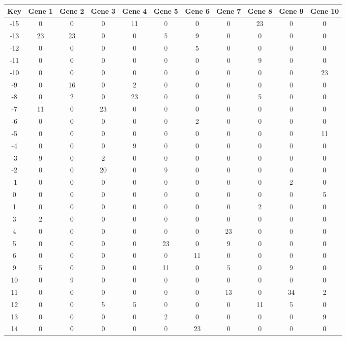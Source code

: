 \begin{tabular}{|c|c|c|c|c|c|c|c|c|c|c|}
\hline
Key & Gene 1 & Gene 2 & Gene 3 & Gene 4 & Gene 5 & Gene 6 & Gene 7 & Gene 8 & Gene 9 & Gene 10 \\
\hline
-15 & 0 & 0 & 0 & 11 & 0 & 0 & 0 & 23 & 0 & 0 \\
-13 & 23 & 23 & 0 & 0 & 5 & 9 & 0 & 0 & 0 & 0 \\
-12 & 0 & 0 & 0 & 0 & 0 & 5 & 0 & 0 & 0 & 0 \\
-11 & 0 & 0 & 0 & 0 & 0 & 0 & 0 & 9 & 0 & 0 \\
-10 & 0 & 0 & 0 & 0 & 0 & 0 & 0 & 0 & 0 & 23 \\
-9 & 0 & 16 & 0 & 2 & 0 & 0 & 0 & 0 & 0 & 0 \\
-8 & 0 & 2 & 0 & 23 & 0 & 0 & 0 & 5 & 0 & 0 \\
-7 & 11 & 0 & 23 & 0 & 0 & 0 & 0 & 0 & 0 & 0 \\
-6 & 0 & 0 & 0 & 0 & 0 & 2 & 0 & 0 & 0 & 0 \\
-5 & 0 & 0 & 0 & 0 & 0 & 0 & 0 & 0 & 0 & 11 \\
-4 & 0 & 0 & 0 & 9 & 0 & 0 & 0 & 0 & 0 & 0 \\
-3 & 9 & 0 & 2 & 0 & 0 & 0 & 0 & 0 & 0 & 0 \\
-2 & 0 & 0 & 20 & 0 & 9 & 0 & 0 & 0 & 0 & 0 \\
-1 & 0 & 0 & 0 & 0 & 0 & 0 & 0 & 0 & 2 & 0 \\
0 & 0 & 0 & 0 & 0 & 0 & 0 & 0 & 0 & 0 & 5 \\
1 & 0 & 0 & 0 & 0 & 0 & 0 & 0 & 2 & 0 & 0 \\
3 & 2 & 0 & 0 & 0 & 0 & 0 & 0 & 0 & 0 & 0 \\
4 & 0 & 0 & 0 & 0 & 0 & 0 & 23 & 0 & 0 & 0 \\
5 & 0 & 0 & 0 & 0 & 23 & 0 & 9 & 0 & 0 & 0 \\
6 & 0 & 0 & 0 & 0 & 0 & 11 & 0 & 0 & 0 & 0 \\
9 & 5 & 0 & 0 & 0 & 11 & 0 & 5 & 0 & 9 & 0 \\
10 & 0 & 9 & 0 & 0 & 0 & 0 & 0 & 0 & 0 & 0 \\
11 & 0 & 0 & 0 & 0 & 0 & 0 & 13 & 0 & 34 & 2 \\
12 & 0 & 0 & 5 & 5 & 0 & 0 & 0 & 11 & 5 & 0 \\
13 & 0 & 0 & 0 & 0 & 2 & 0 & 0 & 0 & 0 & 9 \\
14 & 0 & 0 & 0 & 0 & 0 & 23 & 0 & 0 & 0 & 0 \\
\hline
\end{tabular}